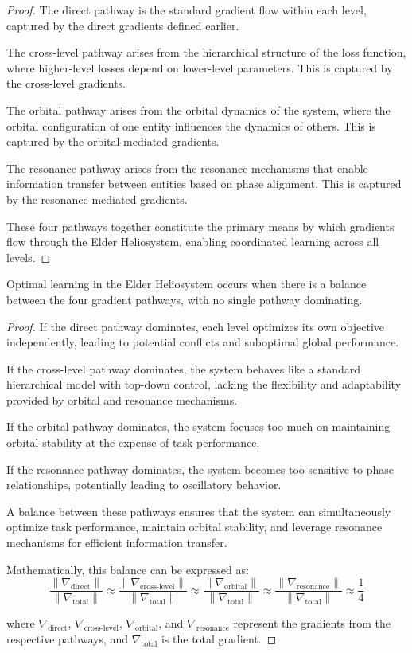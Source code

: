\begin{proof}
The direct pathway is the standard gradient flow within each level, captured by the direct gradients defined earlier.

The cross-level pathway arises from the hierarchical structure of the loss function, where higher-level losses depend on lower-level parameters. This is captured by the cross-level gradients.

The orbital pathway arises from the orbital dynamics of the system, where the orbital configuration of one entity influences the dynamics of others. This is captured by the orbital-mediated gradients.

The resonance pathway arises from the resonance mechanisms that enable information transfer between entities based on phase alignment. This is captured by the resonance-mediated gradients.

These four pathways together constitute the primary means by which gradients flow through the Elder Heliosystem, enabling coordinated learning across all levels.
\end{proof}

\begin{theorem}
Optimal learning in the Elder Heliosystem occurs when there is a balance between the four gradient pathways, with no single pathway dominating.
\end{theorem}

\begin{proof}
If the direct pathway dominates, each level optimizes its own objective independently, leading to potential conflicts and suboptimal global performance.

If the cross-level pathway dominates, the system behaves like a standard hierarchical model with top-down control, lacking the flexibility and adaptability provided by orbital and resonance mechanisms.

If the orbital pathway dominates, the system focuses too much on maintaining orbital stability at the expense of task performance.

If the resonance pathway dominates, the system becomes too sensitive to phase relationships, potentially leading to oscillatory behavior.

A balance between these pathways ensures that the system can simultaneously optimize task performance, maintain orbital stability, and leverage resonance mechanisms for efficient information transfer.

Mathematically, this balance can be expressed as:
\begin{equation}
\frac{\|\nabla_{\text{direct}}\|}{\|\nabla_{\text{total}}\|} \approx \frac{\|\nabla_{\text{cross-level}}\|}{\|\nabla_{\text{total}}\|} \approx \frac{\|\nabla_{\text{orbital}}\|}{\|\nabla_{\text{total}}\|} \approx \frac{\|\nabla_{\text{resonance}}\|}{\|\nabla_{\text{total}}\|} \approx \frac{1}{4}
\end{equation}

where $\nabla_{\text{direct}}$, $\nabla_{\text{cross-level}}$, $\nabla_{\text{orbital}}$, and $\nabla_{\text{resonance}}$ represent the gradients from the respective pathways, and $\nabla_{\text{total}}$ is the total gradient.
\end{proof}

